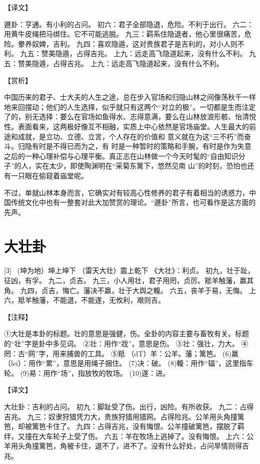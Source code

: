 \documentclass[12pt,UTF8]{ctexbook}
\begin{document}
【译文】

遯卦：亨通。有小利的占问。
初六：君子全部隐退，危险。不利于出行。
六二：用黄牛皮绳把马绑住。它不可能逃脱。
九三：羁系住隐退者，他心里很痛苦，危险。豢养奴婢，吉利。
九四：喜欢隐遁，这对贵族君子是吉利的，对小人则不利。
九五：赞美隐遁，占得吉兆。
上九：远走高飞隐道起来，没有什么不利。
九五：赞美隐遁，占得吉兆。
上九：远走高飞隐道起来，没有什么不利。

【赏析】

中国历来的君子、士大夫的人生之途，总在步入官场和归隐山林之间像荡秋千一样地来回摆动；他们的人生选择，似乎就只有这两个“对立的极”。一切都是生而注定了的，别无选择：要么在官场如鱼得水、志得意满，要么在山林放浪形骸、怡清悦性。表面看来，这两极好像互不相融，实质上中心依然是官场庙堂。人生最大的前途和成就，是立功、立德、立言，个人存在的价值和 意义就在为这“三不朽”而奋斗。归隐有时是不得已而为之，有 时是一种暂时的策略和手腕，有时是作为失意之后的一种心理补偿与心理平衡。真正志在山林做一个今天时髦的“自由知识分 子”的人，实在太少，即使陶渊明在“采菊东篱下，悠然见南 山”的时刻，恐怕也还有一只眼在偷窥着庙堂呢。

不过，单就山林本身而言，它确实对有较高心性修养的君子有着相当的诱惑力，中国传统文化中也有一整套对此大加赞赏的理论。“遯卦”所言，也可看作是这方面的先声。

\chapter{大壮卦}
[3] \ (坤为地）坤上坤下
（雷天大壮）震上乾下
《大壮》：利贞。
初九，壮于趾，征凶，有孚。
九二，贞吉。
九三，小人用壮，君子用罔，贞厉。羝羊触藩，羸其角。
九四，贞吉，悔亡。藩决不羸，壮于大舆之輹。
六五，丧羊于易，无悔。
上六，羝羊触藩，不能退，不能遂，无攸利，艰则吉。

【注释】

①大壮是本卦的标题。壮的意思是强健，伤。全卦的内容主要与畜牧有关。标题的“壮”字是卦中多见词。
②壮：用作“戕”，意思是伤。
③壮：强壮，力大。
④罔：古“网”字，用来捕兽的工具。
⑤羝 （dT）羊：公羊。藩；篱笆。
(6)羸（lei）：用作“累”，意思是用绳子捆住。
(7)决：破。
(8)輹：用作“辐”，这里指车轮。
(9)易：用作“场”，指放牧的牧场。
(10)遂：进。

【译文】

大壮卦：吉利的占问。
初九：脚趾受了伤。出行，凶险。有所收获。
九二：占得吉兆。
九三：奴隶狩猎凭力大，贵族狩猎用猎网。占得险兆。公羊用头角撞篱笆，却被篱笆卡住了。
九四：占得吉兆，没有悔恨。公羊撞破篱笆，摆脱了羁绊，又撞在大车轮子上受了伤。
六五：羊在牧场上逃掉了。没有悔恨。
上六：公羊用头角撞篱笆，角被卡住，退不了，进不了。没有什么好处，占问旱情则得吉兆。
\end{document}
